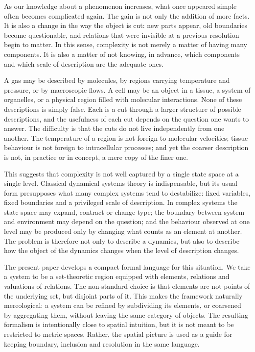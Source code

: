 \documentclass[runningheads]{llncs}
\begin{document}
As our knowledge about a phenomenon increases, what once appeared simple often becomes complicated again. The gain is not only the addition of more facts. It is also a change in the way the object is cut: new parts appear, old boundaries become questionable, and relations that were invisible at a previous resolution begin to matter. In this sense, complexity is not merely a matter of having many components. It is also a matter of not knowing, in advance, which components and which scale of description are the adequate ones.

A gas may be described by molecules, by regions carrying temperature and pressure, or by macroscopic flows. A cell may be an object in a tissue, a system of organelles, or a physical region filled with molecular interactions. None of these descriptions is simply false. Each is a cut through a larger structure of possible descriptions, and the usefulness of each cut depends on the question one wants to answer. The difficulty is that the cuts do not live independently from one another. The temperature of a region is not foreign to molecular velocities; tissue behaviour is not foreign to intracellular processes; and yet the coarser description is not, in practice or in concept, a mere copy of the finer one.

This suggests that complexity is not well captured by a single state space at a single level. Classical dynamical systems theory is indispensable, but its usual form presupposes what many complex systems tend to destabilize: fixed variables, fixed boundaries and a privileged scale of description. In complex systems the state space may expand, contract or change type; the boundary between system and environment may depend on the question; and the behaviour observed at one level may be produced only by changing what counts as an element at another. The problem is therefore not only to describe a dynamics, but also to describe how the object of the dynamics changes when the level of description changes.

The present paper develops a compact formal language for this situation. We take a system to be a set-theoretic region equipped with elements, relations and valuations of relations. The non-standard choice is that elements are not points of the underlying set, but disjoint parts of it. This makes the framework naturally mereological: a system can be refined by subdividing its elements, or coarsened by aggregating them, without leaving the same category of objects. The resulting formalism is intentionally close to spatial intuition, but it is not meant to be restricted to metric spaces. Rather, the spatial picture is used as a guide for keeping boundary, inclusion and resolution in the same language.
\end{document}
